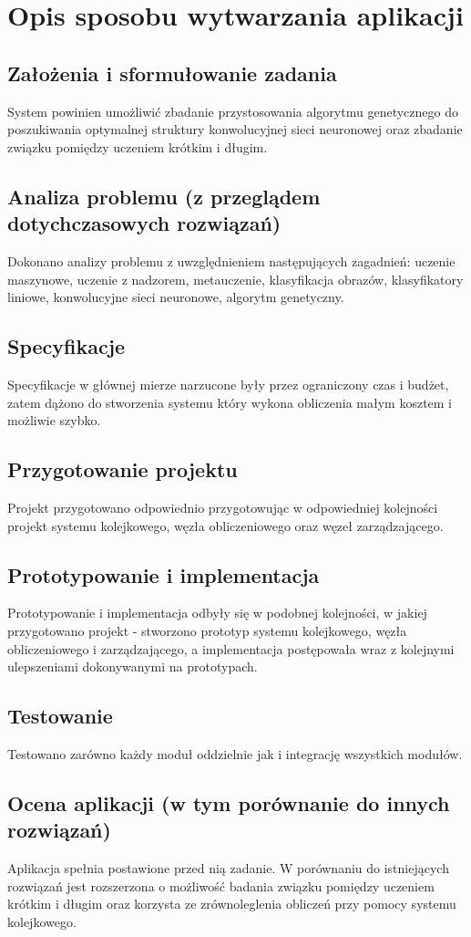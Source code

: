 \section{Opis sposobu wytwarzania aplikacji}
\subsection{Założenia i sformułowanie zadania}
System powinien umożliwić zbadanie przystosowania algorytmu genetycznego do poszukiwania optymalnej struktury konwolucyjnej sieci neuronowej oraz zbadanie związku pomiędzy uczeniem krótkim i długim.
\subsection{Analiza problemu (z przeglądem dotychczasowych rozwiązań)}
Dokonano analizy problemu z uwzględnieniem następujących zagadnień: uczenie maszynowe, uczenie z nadzorem, metauczenie, klasyfikacja obrazów, klasyfikatory liniowe, konwolucyjne sieci neuronowe, algorytm genetyczny.
\subsection{Specyfikacje}
Specyfikacje w głównej mierze narzucone były przez ograniczony czas i budżet, zatem dążono do stworzenia systemu który wykona obliczenia małym kosztem i możliwie szybko.
\subsection{Przygotowanie projektu}
Projekt przygotowano odpowiednio przygotowując w odpowiedniej kolejności projekt systemu kolejkowego, węzła obliczeniowego oraz węzeł zarządzającego.
\subsection{Prototypowanie i implementacja}
Prototypowanie i implementacja odbyły się w podobnej kolejności, w jakiej przygotowano projekt - stworzono prototyp systemu kolejkowego, węzła obliczeniowego i zarządzającego, a implementacja postępowała wraz z kolejnymi ulepszeniami dokonywanymi na prototypach.
\subsection{Testowanie}
Testowano zarówno każdy moduł oddzielnie jak i integrację wszystkich modułów.
\subsection{Ocena aplikacji (w tym porównanie do innych rozwiązań)}
Aplikacja spełnia postawione przed nią zadanie. W porównaniu do istniejących rozwiązań jest rozszerzona o możliwość badania związku pomiędzy uczeniem krótkim i długim oraz korzysta ze zrównoleglenia obliczeń przy pomocy systemu kolejkowego.

